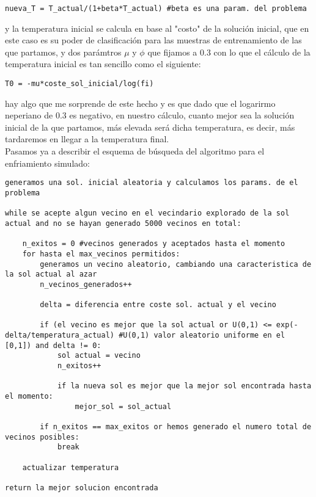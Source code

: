 \documentclass[10pt,a4paper]{article}
\begin{document}
\begin{lstlisting}
nueva_T = T_actual/(1+beta*T_actual) #beta es una param. del problema
\end{lstlisting}

y la temperatura inicial se calcula en base al "costo" de la solución inicial, que en este caso es su poder de clasificación para las muestras de entrenamiento de las que partamos, y dos parámtros $\mu$ y $\phi$ que fijamos a 0.3 con lo que el cálculo de la temperatura inicial es tan sencillo como el siguiente:\\

\begin{lstlisting}
T0 = -mu*coste_sol_inicial/log(fi)
\end{lstlisting}

hay algo que me sorprende de este hecho y es que dado que el logarirmo neperiano de 0.3 es negativo, en nuestro cálculo, cuanto mejor sea la solución inicial de la que partamos, más elevada será dicha temperatura, es decir, más tardaremos en llegar a la temperatura final.\\

Pasamos ya a describir el esquema de búsqueda del algoritmo para el enfriamiento simulado:\\

\begin{lstlisting}
generamos una sol. inicial aleatoria y calculamos los params. de el problema

while se acepte algun vecino en el vecindario explorado de la sol actual and no se hayan generado 5000 vecinos en total:

	n_exitos = 0 #vecinos generados y aceptados hasta el momento
	for hasta el max_vecinos permitidos:
		generamos un vecino aleatorio, cambiando una caracteristica de la sol actual al azar
		n_vecinos_generados++
		
		delta = diferencia entre coste sol. actual y el vecino
		
		if (el vecino es mejor que la sol actual or U(0,1) <= exp(-delta/temperatura_actual) #U(0,1) valor aleatorio uniforme en el [0,1]) and delta != 0:
			sol actual = vecino
			n_exitos++
		
			if la nueva sol es mejor que la mejor sol encontrada hasta el momento:
				mejor_sol = sol_actual
			
		if n_exitos == max_exitos or hemos generado el numero total de vecinos posibles:
			break
			
	actualizar temperatura	
	
return la mejor solucion encontrada
\end{lstlisting}
\end{document}
